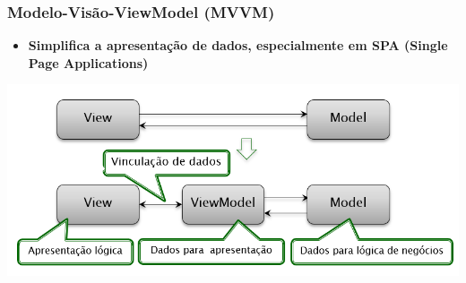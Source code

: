 \documentclass{beamer}
\begin{document}
\begin{frame}
      \frametitle{Modelo-Visão-ViewModel (MVVM)}

      \begin{itemize}
            \item \textbf{Simplifica a apresentação de dados, especialmente em SPA (Single Page Applications)}
      \end{itemize}
      \begin{center}
            \includegraphics[width=0.8\linewidth]{assets/aula-tads-pdwa5/mvvm.png}
      \end{center}
\end{frame}
\end{document}
